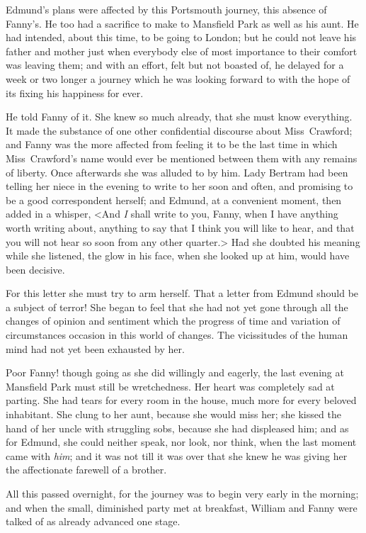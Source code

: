 Edmund's plans were affected by this Portsmouth journey, this absence of Fanny's. He too had a sacrifice to make to Mansfield Park as well as his aunt. He had intended, about this time, to be going to London; but he could not leave his father and mother just when everybody else of most importance to their comfort was leaving them; and with an effort, felt but not boasted of, he delayed for a week or two longer a journey which he was looking forward to with the hope of its fixing his happiness for ever.

He told Fanny of it. She knew so much already, that she must know everything. It made the substance of one other confidential discourse about Miss~Crawford; and Fanny was the more affected from feeling it to be the last time in which Miss~Crawford's name would ever be mentioned between them with any remains of liberty. Once afterwards she was alluded to by him. Lady Bertram had been telling her niece in the evening to write to her soon and often, and promising to be a good correspondent herself; and Edmund, at a convenient moment, then added in a whisper, <And \textit{I}  shall write to you, Fanny, when I have anything worth writing about, anything to say that I think you will like to hear, and that you will not hear so soon from any other quarter.> Had she doubted his meaning while she listened, the glow in his face, when she looked up at him, would have been decisive.

For this letter she must try to arm herself. That a letter from Edmund should be a subject of terror! She began to feel that she had not yet gone through all the changes of opinion and sentiment which the progress of time and variation of circumstances occasion in this world of changes. The vicissitudes of the human mind had not yet been exhausted by her.

Poor Fanny! though going as she did willingly and eagerly, the last evening at Mansfield Park must still be wretchedness. Her heart was completely sad at parting. She had tears for every room in the house, much more for every beloved inhabitant. She clung to her aunt, because she would miss her; she kissed the hand of her uncle with struggling sobs, because she had displeased him; and as for Edmund, she could neither speak, nor look, nor think, when the last moment came with \textit{him}; and it was not till it was over that she knew he was giving her the affectionate farewell of a brother.

All this passed overnight, for the journey was to begin very early in the morning; and when the small, diminished party met at breakfast, William and Fanny were talked of as already advanced one stage. 